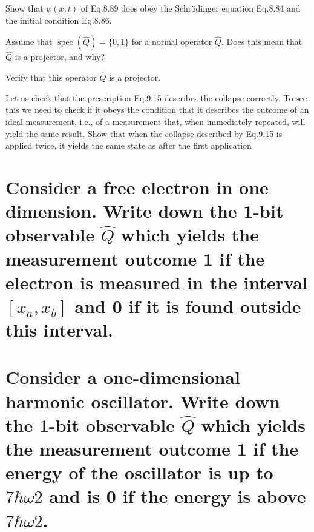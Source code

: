 \documentclass[boxes,pages]{homework}
\makeatletter
\DeclareMathOperator{\spec}{spec}
\numberwithin{@problem}{section}
\makeatother
\begin{document}
\setcounter{section}{8}

\begin{problem}
Show that $\psi(x,t)$ of Eq.8.89 does obey the Schr\"odinger equation Eq.8.84 and the initial condition Eq.8.86.
\end{problem}

\setcounter{section}{9}

\begin{problem}
Assume that $\spec(\hat{Q}) = \{0,1\}$ for a normal operator $\hat{Q}$. Does this mean that $\hat{Q}$ is a projector, and why?
\end{problem}

\begin{problem}
Verify that this operator $\hat{Q}$ is a projector.
\end{problem}

\begin{problem}
Let us check that the prescription Eq.9.15 describes the collapse correctly. To see this we need to check if it obeys the condition that it describes the outcome of an ideal measurement, i.e., of a measurement that, when immediately repeated, will yield the same result. Show that when the collapse described by Eq.9.15 is applied twice, it yields the same state as after the first application
\end{problem}

\begin{problem}
\begin{parts}
	\part{Consider a free electron in one dimension. Write down the 1-bit observable $\hat{Q}$ which yields the measurement outcome 1 if the electron is measured in the interval $[x_a, x_b]$ and 0 if it is found outside this interval.}\label{part:4a}
	\part{Consider a one-dimensional harmonic oscillator. Write down the 1-bit observable $\hat{Q}$ which yields the measurement outcome 1 if the energy of the oscillator is up to $7\hbar\omega 2$ and is 0 if the energy is above $7\hbar\omega 2$.}\label{part:4b}
\end{parts}
\end{problem}

\setcounter{section}{10}
\end{document}
